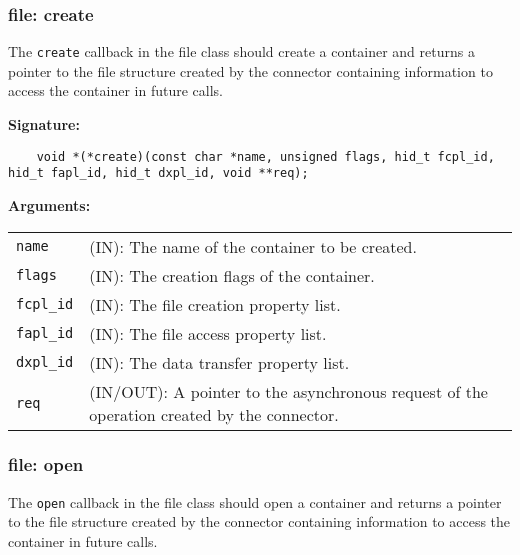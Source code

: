 \subsubsection{file: create}
The \texttt{create} callback in the file class should create a container
and returns a pointer to the file structure created by the connector containing information to
access the container in future calls.\medskip

\begin{mdframed}[style=bgbox]
\textbf{Signature:}
\begin{lstlisting}
    void *(*create)(const char *name, unsigned flags, hid_t fcpl_id, hid_t fapl_id, hid_t dxpl_id, void **req);
\end{lstlisting}

\textbf{Arguments:}\\
\begin{tabular}{l p{13.5cm}}
  \texttt{name} & (IN): The name of the container to be created.\\
  \texttt{flags} & (IN): The creation flags of the container.\\
  \texttt{fcpl\_id} & (IN): The file creation property list.\\
  \texttt{fapl\_id} & (IN): The file access property list.\\
  \texttt{dxpl\_id} & (IN): The data transfer property list.\\
  \texttt{req} & (IN/OUT): A pointer to the asynchronous request of the
  operation created by the connector.\\
\end{tabular}
\end{mdframed}

\hspace*{\fill}

\subsubsection{file: open}
The \texttt{open} callback in the file class should open a container and
returns a pointer to the file structure created by the connector containing information to
access the container in future calls.\bigskip

